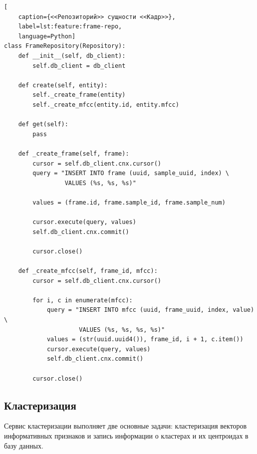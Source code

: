 \begin{lstlisting}[
	caption={<<Репозиторий>> сущности <<Кадр>>},
	label=lst:feature:frame-repo,
	language=Python]
class FrameRepository(Repository):
    def __init__(self, db_client):
        self.db_client = db_client

    def create(self, entity):
        self._create_frame(entity)
        self._create_mfcc(entity.id, entity.mfcc)

    def get(self):
        pass

    def _create_frame(self, frame):
        cursor = self.db_client.cnx.cursor()
        query = "INSERT INTO frame (uuid, sample_uuid, index) \
        		 VALUES (%s, %s, %s)"
        		 
        values = (frame.id, frame.sample_id, frame.sample_num)

        cursor.execute(query, values)
        self.db_client.cnx.commit()
        
        cursor.close()

    def _create_mfcc(self, frame_id, mfcc):
        cursor = self.db_client.cnx.cursor()

        for i, c in enumerate(mfcc):
            query = "INSERT INTO mfcc (uuid, frame_uuid, index, value) \
             		 VALUES (%s, %s, %s, %s)"
            values = (str(uuid.uuid4()), frame_id, i + 1, c.item())
            cursor.execute(query, values)
            self.db_client.cnx.commit()

        cursor.close()
\end{lstlisting}

\subsection{Кластеризация}
Сервис кластеризации выполняет две основные задачи: кластеризация векторов информативных признаков и запись информации о кластерах и их центроидах в базу данных.

